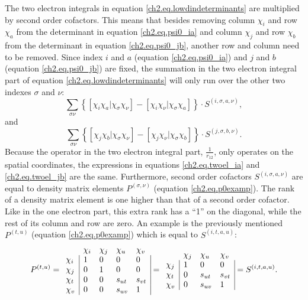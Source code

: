 The two electron integrals in equation \ref{ch2.eq.lowdindeterminants} are multiplied by second order cofactors. This means that besides removing column $\chi_i$ and row $\chi_a$ from the determinant in equation \ref{ch2.eq.psi0_ia} and column $\chi_j$ and row $\chi_b$ from the determinant in equation \ref{ch2.eq.psi0_jb}, another row and column need to be removed. Since index $i$ and $a$ (equation \ref{ch2.eq.psi0_ia}) and $j$ and $b$ (equation \ref{ch2.eq.psi0_jb}) are fixed, the summation in the two electron integral part of equation \ref{ch2.eq.lowdindeterminants} will only run over the other two indexes $\sigma$ and $\nu$:
\begin{equation}
\sum_{\sigma\nu} \left\{ [\chi_i\chi_a|\chi_\sigma\chi_\nu] - [\chi_i\chi_\nu|\chi_\sigma\chi_a] \right\} \cdot S^{(i,\sigma,a,\nu)},
\label{ch2.eq.twoel_ia}
\end{equation}
and
\begin{equation}
\sum_{\sigma\nu} \left\{ [\chi_j\chi_b|\chi_\sigma\chi_\nu] - [\chi_j\chi_\nu|\chi_\sigma\chi_b] \right\} \cdot S^{(j,\sigma,b,\nu)}.
\label{ch2.eq.twoel_jb}
\end{equation}
Because the operator in the two electron integral part, $\frac{1}{r_{12}}$, only operates on the spatial coordinates, the expressions in equations \ref{ch2.eq.twoel_ia} and \ref{ch2.eq.twoel_jb} are the same. Furthermore, second order cofactors $S^{(i,\sigma,a,\nu)}$ are equal to density matrix elements $P^{(\sigma,\nu)}$ (equation \ref{ch2.eq.p0examp}). The rank of a density matrix element is one higher than that of a second order cofactor. Like in the one electron part, this extra rank has a ``1'' on the diagonal, while the rest of its column and row are zero. An example is the previously mentioned $P^{(t,u)}$ (equation \ref{ch2.eq.p0examp}) which is equal to $S^{(i,t,a,u)}$:
\begin{equation}
P^{(t,u)}=
\begin{array}{lllll}
 &  \chi_i & \chi_j & \chi_u & \chi_v \\
 \chi_i & \multicolumn{1}{|l}{ 1 } & 0 & 0 & \multicolumn{1}{l|}{ 0 } \\
 \chi_j & \multicolumn{1}{|l}{ 0 } & 1 & 0 & \multicolumn{1}{l|}{ 0 } \\
 \chi_t & \multicolumn{1}{|l}{ 0 } & 0 & s_{ut} & \multicolumn{1}{l|}{s_{vt}} \\
 \chi_v & \multicolumn{1}{|l}{ 0 } & 0 & s_{uv} & \multicolumn{1}{l|}{1}
\end{array}=
\begin{array}{llll}
 & \chi_j & \chi_u & \chi_v \\
 \chi_j & \multicolumn{1}{|l}{ 1 } & 0 & \multicolumn{1}{l|}{ 0 } \\
 \chi_t & \multicolumn{1}{|l}{ 0 } & s_{ut} & \multicolumn{1}{l|}{s_{vt}} \\
 \chi_v & \multicolumn{1}{|l}{ 0 } & s_{uv} & \multicolumn{1}{l|}{1}
\end{array}=S^{(i,t,a,u)}.
\end{equation}
